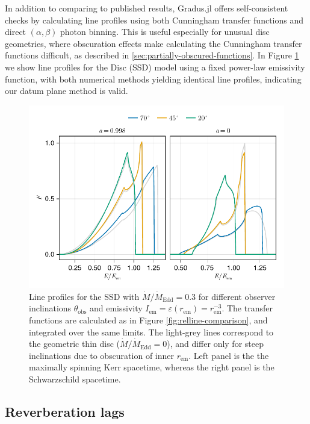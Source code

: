 \documentclass[fleqn,usenatbib]{mnras}
\newcommand{\Gradus}{Gradus.jl\xspace}
\begin{document}
In addition to comparing to published results, \Gradus offers self-consistent
checks by calculating line profiles using both Cunningham transfer functions and
direct $(\alpha, \beta)$ photon binning. This is useful especially for unusual
disc geometries, where obscuration effects make calculating the Cunningham
transfer functions difficult, as described in
\ref{sec:partially-obscured-functions}. In Figure \ref{fig:line-profile-ssd} we
show line profiles for the \citet{shakura_black_1973} Disc (SSD) model using a fixed power-law emissivity
function, with both numerical methods yielding identical line profiles,
indicating our datum plane method is valid.

\begin{figure}
	\centering
	\includegraphics[width=0.99\linewidth]{figures/lineprofiles.ssd.pdf}
	\caption{Line profiles for the SSD with $\dot{M} / \dot{M}_\text{Edd} = 0.3$ for different observer inclinations $\theta_\text{obs}$ and emissivity $I_\text{em} = \varepsilon(r_\text{em}) = r_\text{em}^{-3}$. The transfer functions are calculated as in Figure \ref{fig:relline-comparison}, and integrated over the same limits. The light-grey lines correspond to the geometric thin disc ($\dot{M} / \dot{M}_\text{Edd} = 0$), and differ only for steep inclinations due to obscuration of inner $r_\text{em}$. Left panel is the the maximally spinning Kerr spacetime, whereas the right panel is the Schwarzschild spacetime.}
	\label{fig:line-profile-ssd}
\end{figure}


\subsection{Reverberation lags}
\label{sec:lag-transfer-functions}
\end{document}
